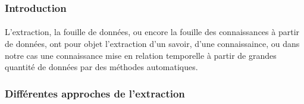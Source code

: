 \documentclass[12pt,a4	]{report}
\begin{document}
\subsubsection*{Introduction}
\paragraph{}
L'extraction, la fouille de données, ou encore la fouille des connaissances à partir de données, ont pour objet l'extraction d'un savoir, d'une connaissaince, ou dans notre cas une connaissance mise en relation temporelle à partir de grandes quantité de données par des méthodes automatiques.
\subsubsection*{Différentes approches de l'extraction }
\end{document}
